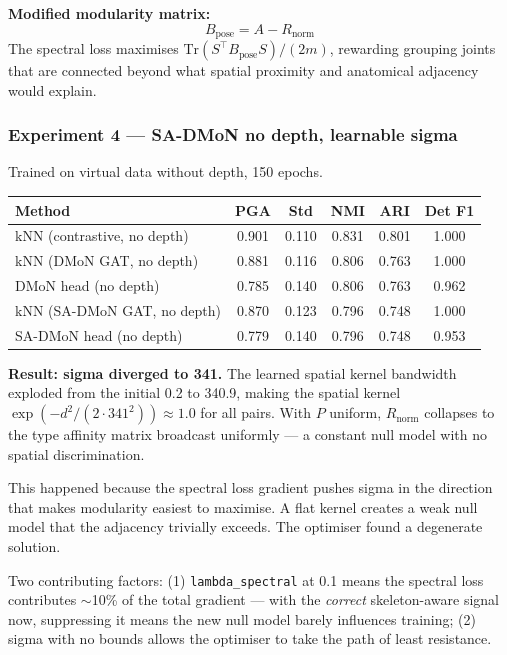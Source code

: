 \textbf{Modified modularity matrix:}
\begin{equation}
B_{\text{pose}} = A - R_{\text{norm}}
\end{equation}
The spectral loss maximises $\text{Tr}(S^\top B_{\text{pose}} S) / (2m)$, rewarding grouping joints that are connected beyond what spatial proximity and anatomical adjacency would explain.


\subsubsection{Experiment 4 --- SA-DMoN no depth, learnable sigma}

Trained on virtual data without depth, 150 epochs.

\begin{center}
\begin{tabular}{lccccc}
\toprule
Method & PGA & Std & NMI & ARI & Det F1 \\
\midrule
kNN (contrastive, no depth) & 0.901 & 0.110 & 0.831 & 0.801 & 1.000 \\
kNN (DMoN GAT, no depth) & 0.881 & 0.116 & 0.806 & 0.763 & 1.000 \\
DMoN head (no depth) & 0.785 & 0.140 & 0.806 & 0.763 & 0.962 \\
kNN (SA-DMoN GAT, no depth) & 0.870 & 0.123 & 0.796 & 0.748 & 1.000 \\
SA-DMoN head (no depth) & 0.779 & 0.140 & 0.796 & 0.748 & 0.953 \\
\bottomrule
\end{tabular}
\end{center}

\textbf{Result: sigma diverged to 341.} The learned spatial kernel bandwidth exploded from the initial 0.2 to 340.9, making the spatial kernel $\exp(-d^2 / (2 \cdot 341^2)) \approx 1.0$ for all pairs. With $P$ uniform, $R_{\text{norm}}$ collapses to the type affinity matrix broadcast uniformly --- a constant null model with no spatial discrimination.

This happened because the spectral loss gradient pushes sigma in the direction that makes modularity easiest to maximise. A flat kernel creates a weak null model that the adjacency trivially exceeds. The optimiser found a degenerate solution.

Two contributing factors: (1) \texttt{lambda\_spectral} at 0.1 means the spectral loss contributes $\sim$10\% of the total gradient --- with the \emph{correct} skeleton-aware signal now, suppressing it means the new null model barely influences training; (2) sigma with no bounds allows the optimiser to take the path of least resistance.


